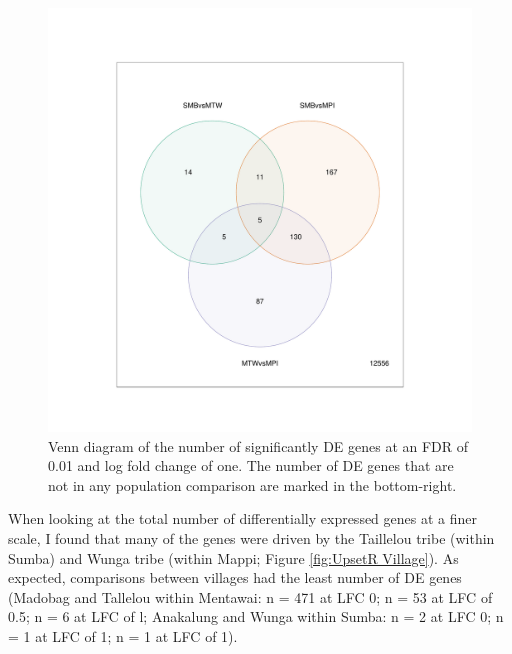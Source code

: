 \documentclass[12pt,a4paper,titlepage,twoside,openright]{book}
\begin{document}
\begin{mainmatter}
{{\begin{figure}[htb!]
\centering
\includegraphics[width=\textwidth,height=\textheight,keepaspectratio]{Figures/vennDiagram_allSigDEGenes_pval01_FDR1_dupCor.pdf}
\caption{Venn diagram of the number of significantly DE genes at an FDR of 0.01 and log fold change of one. The number of DE genes that are not in any population comparison are marked in the bottom-right.}
\label{fig:Venn Diagram between Islands}
\end{figure}

When looking at the total number of differentially expressed genes at a finer scale, I found that many of the genes were driven by the Taillelou tribe (within Sumba) and Wunga tribe (within Mappi; Figure \ref{fig:UpsetR Village}). As expected, comparisons between villages had the least number of DE genes (Madobag and Tallelou within Mentawai: n = 471 at LFC 0; n = 53 at LFC of 0.5; n = 6 at LFC of l; Anakalung and Wunga within Sumba: n = 2 at LFC 0; n = 1 at LFC of 1; n = 1 at LFC of 1). 

}}
\end{mainmatter}
\end{document}
